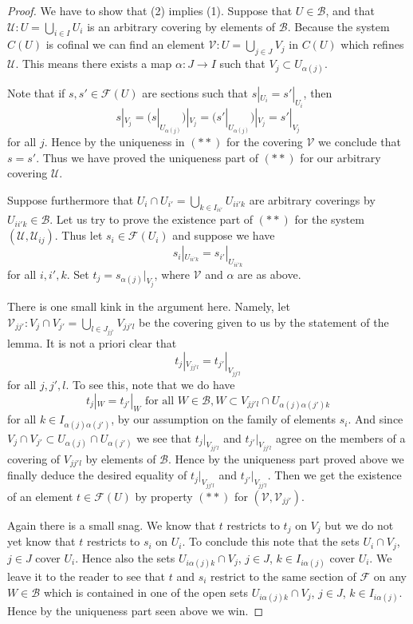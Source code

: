 \documentclass{stacks-project}
\theoremstyle{plain}
\theoremstyle{definition}
\theoremstyle{remark}
\numberwithin{equation}{subsection}
\begin{document}
\begin{proof}
We have to show that (2) implies (1).
Suppose that $U \in \mathcal{B}$, and that
$\mathcal{U} : U = \bigcup_{i\in I} U_i$ is an arbitrary covering
by elements of $\mathcal{B}$.  Because the system $C(U)$ is cofinal
we can find an element $\mathcal{V} : U = \bigcup_{j \in J} V_j$
in $C(U)$ which refines $\mathcal{U}$. This means there exists
a map $\alpha : J \to I$ such that $V_j \subset U_{\alpha(j)}$.

\medskip\noindent
Note that if $s, s' \in \mathcal{F}(U)$ are sections such
that $s|_{U_i} = s'|_{U_i}$, then
$$
s|_{V_j}
= (s|_{U_{\alpha(j)}})|_{V_j}
= (s'|_{U_{\alpha(j)}})|_{V_j}
= s'|_{V_j}
$$
for all $j$. Hence by the uniqueness in $(**)$
for the covering $\mathcal{V}$ we conclude that $s = s'$.
Thus we have proved the uniqueness part of $(**)$
for our arbitrary covering $\mathcal{U}$.

\medskip\noindent
Suppose furthermore that $U_i \cap U_{i'} = \bigcup_{k \in I_{ii'}} U_{ii'k}$
are arbitrary coverings by $U_{ii'k} \in \mathcal{B}$.
Let us try to prove the existence part of $(**)$ for the system
$(\mathcal{U}, \mathcal{U}_{ij})$. Thus let $s_i \in \mathcal{F}(U_i)$
and suppose we have
$$
s_i|_{U_{ii'k}} = s_{i'}|_{U_{ii'k}}
$$
for all $i, i', k$. Set $t_j = s_{\alpha(j)}|_{V_j}$, where $\mathcal{V}$
and $\alpha$ are as above.

\medskip\noindent
There is one small kink in the argument here. Namely, let
$\mathcal{V}_{jj'} : V_j \cap V_{j'} = \bigcup_{l \in J_{jj'}} V_{jj'l}$
be the covering given to us by the statement of the lemma.
It is not a priori clear that
$$
t_j|_{V_{jj'l}} = t_{j'}|_{V_{jj'l}}
$$
for all $j, j', l$. To see this, note that we do have
$$
t_j|_W = t_{j'}|_W \text{ for all } W \in \mathcal{B},
W \subset V_{jj'l} \cap U_{\alpha(j)\alpha(j')k}
$$
for all $k \in I_{\alpha(j)\alpha(j')}$, by our assumption on
the family of elements $s_i$. And since
$V_j \cap V_{j'} \subset U_{\alpha(j)} \cap U_{\alpha(j')}$
we see that $t_j|_{V_{jj'l}}$ and $t_{j'}|_{V_{jj'l}}$
agree on the members of a covering of $V_{jj'l}$ by
elements of $\mathcal{B}$. Hence by the uniqueness part proved above
we finally deduce the desired equality of
$t_j|_{V_{jj'l}}$ and $t_{j'}|_{V_{jj'l}}$.
Then we get the existence of an element $t \in \mathcal{F}(U)$
by property $(**)$ for $(\mathcal{V}, \mathcal{V}_{jj'})$.

\medskip\noindent
Again there is a small snag. We know that $t$ restricts to $t_j$ on $V_j$
but we do not yet know that $t$ restricts to $s_i$ on $U_i$. To conclude
this note that the sets $U_i \cap V_j$, $j \in J$ cover $U_i$. Hence
also the sets $U_{i \alpha(j) k} \cap V_j$, $j\in J$, $k \in I_{i\alpha(j)}$
cover $U_i$. We leave it to the reader to see that $t$ and $s_i$ restrict
to the same section of $\mathcal{F}$ on any $W \in \mathcal{B}$
which is contained in one of the open sets
$U_{i \alpha(j) k} \cap V_j$, $j\in J$, $k \in I_{i\alpha(j)}$.
Hence by the uniqueness part seen above we win.
\end{proof}
\end{document}
